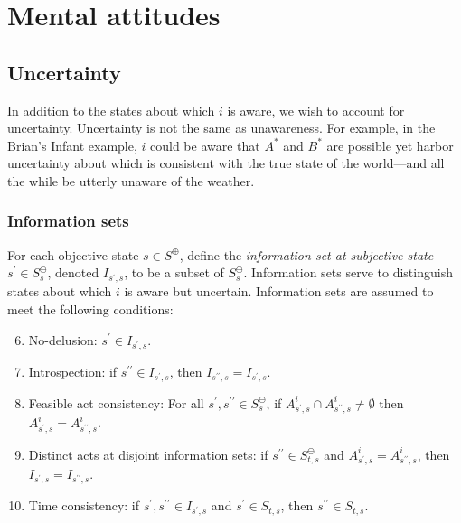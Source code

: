 \documentclass[
11pt,
titlepage,
reqno,
]{article}%
\theoremstyle{definition}
\begin{document}
\section{Mental attitudes}
	
\subsection{Uncertainty}
	
In addition to the states about which $i$ is aware, we wish to account for uncertainty. 
Uncertainty is not the same as unawareness.
For example, in the Brian's Infant example, $i$ could be aware that $A^\ast$ and $B^\ast$ are possible yet harbor uncertainty about which is consistent with the true state of the world---and all the while be utterly unaware of the weather.

\subsubsection{Information sets}
For each objective state $s\in S^\oplus$, define the\textit{ information set at subjective state} $s^\prime\in S^\ominus_s$, denoted $I_{s^\prime,s}$,  to be a subset of $S^\ominus_s$.  
Information sets serve to distinguish states about which $i$ is aware but uncertain. 
Information sets are assumed to meet the following conditions:	
\begin{enumerate}
	\setcounter{enumi}{5}
	\item No-delusion: $s^\prime\in I_{s^\prime,s}$.
	\item Introspection: if $s^{\prime\prime}\in I_{s^\prime,s}$, then $I_{s^{\prime\prime},s}=I_{s^\prime,s}$.
	\item Feasible act consistency: For all $s^\prime,s^{\prime\prime}\in S^\ominus_s$, if $A^i_{s^\prime,s}\cap A^i_{s^{\prime\prime},s}\ne \emptyset$ then $A^i_{s^\prime,s}= A^i_{s^{\prime\prime},s}$.
	\item Distinct acts at disjoint information sets: if $s^{\prime\prime}\in S^\ominus_{t,s}$ and $A^i_{s^\prime,s}= A^i_{s^{\prime\prime},s}$, then $I_{s^\prime,s}=I_{s^{\prime\prime},s}$.
	\item Time consistency: if $s^\prime,s^{\prime\prime}\in I_{s^\prime,s}$ and $s^\prime\in S_{t,s}$, then $s^{\prime\prime}\in S_{t,s}$.
\end{enumerate}
\end{document}
